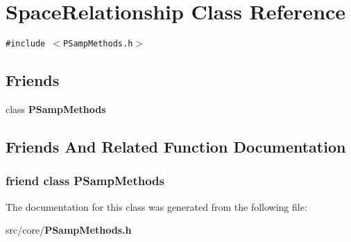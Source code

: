 \section{Space\-Relationship Class Reference}
\label{classSpaceRelationship}
{\tt \#include $<$PSamp\-Methods.h$>$}

\subsection*{Friends}
\begin{CompactItemize}
\item 
class {\bf PSamp\-Methods}
\end{CompactItemize}


\subsection{Friends And Related Function Documentation}
\subsubsection{\setlength{\rightskip}{0pt plus 5cm}friend class {\bf PSamp\-Methods}\hspace{0.3cm}{\tt  [friend]}}\label{classSpaceRelationship_145d91c7a73eaba028e6d88ef3ed7970}




The documentation for this class was generated from the following file:\begin{CompactItemize}
\item 
src/core/{\bf PSamp\-Methods.h}\end{CompactItemize}

